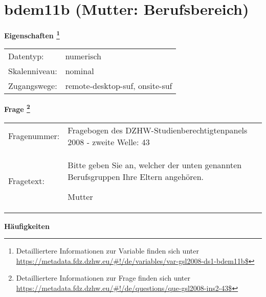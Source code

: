 
    \setcounter{footnote}{0}

    \vspace*{-1.8cm}
	\section{bdem11b (Mutter: Berufsbereich)}
	\label{section:bdem11b}



    \vspace*{0.5cm}
    \noindent\textbf{Eigenschaften
	\footnote{Detailliertere Informationen zur Variable finden sich unter
		\url{https://metadata.fdz.dzhw.eu/\#!/de/variables/var-gsl2008-ds1-bdem11b$}}}\\
	\begin{tabularx}{\hsize}{@{}lX}
	Datentyp: & numerisch \\
	Skalenniveau: & nominal \\
	Zugangswege: &
	  remote-desktop-suf, 
	  onsite-suf
 \\
    \end{tabularx}



				\vspace*{0.5cm}
                \noindent\textbf{Frage
	                \footnote{Detailliertere Informationen zur Frage finden sich unter
		              \url{https://metadata.fdz.dzhw.eu/\#!/de/questions/que-gsl2008-ins2-43$}}}\\
				\begin{tabularx}{\hsize}{@{}lX}
					Fragenummer: &
					  Fragebogen des DZHW-Studienberechtigtenpanels 2008 - zweite Welle:
					  43
 \\
					Fragetext: & Bitte geben Sie an, welcher der unten genannten Berufsgruppen Ihre Eltern angehören.\par  Mutter \\
				\end{tabularx}





        		\vspace*{0.5cm}
                \noindent\textbf{Häufigkeiten}

